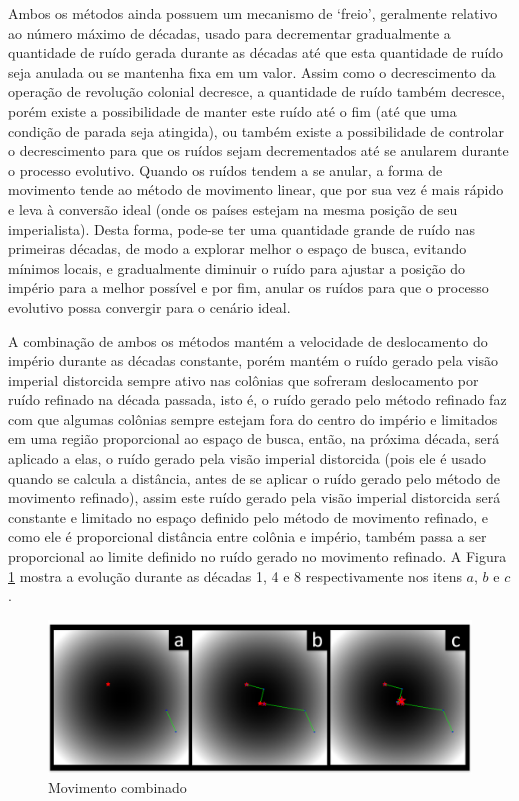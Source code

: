 Ambos os métodos ainda possuem um mecanismo de ‘freio’, geralmente relativo ao número máximo de décadas, usado para decrementar gradualmente a quantidade de ruído gerada durante as décadas até que esta quantidade de ruído seja anulada ou se mantenha fixa em um valor. Assim como o decrescimento da operação de revolução colonial decresce, a quantidade de ruído também decresce, porém existe a possibilidade de manter este ruído até o fim (até que uma condição de parada seja atingida), ou também existe a possibilidade de controlar o decrescimento para que os ruídos sejam decrementados até se anularem durante o processo evolutivo. Quando os ruídos tendem a se anular, a forma de movimento tende ao método de movimento linear, que por sua vez é mais rápido e leva à conversão ideal (onde os países estejam na mesma posição de seu imperialista). Desta forma, pode-se ter uma quantidade grande de ruído nas primeiras décadas, de modo a explorar melhor o espaço de busca, evitando mínimos locais, e gradualmente diminuir o ruído para ajustar a posição do império para a melhor possível e por fim, anular os ruídos para que o processo evolutivo possa convergir para o cenário ideal.

A combinação de ambos os métodos mantém a velocidade de deslocamento do império durante as décadas constante, porém mantém o ruído gerado pela visão imperial distorcida sempre ativo nas colônias que sofreram deslocamento por ruído refinado na década passada, isto é, o ruído gerado pelo método refinado faz com que algumas colônias sempre estejam fora do centro do império e limitados em uma região proporcional ao espaço de busca, então, na próxima década, será aplicado a elas, o ruído gerado pela visão imperial distorcida (pois ele é usado quando se calcula a distância, antes de se aplicar o ruído gerado pelo método de movimento refinado), assim este ruído gerado pela visão imperial distorcida será constante e limitado no espaço definido pelo método de movimento refinado, e como ele é proporcional distância entre colônia e império, também passa a ser proporcional ao limite definido no ruído gerado no movimento refinado. A Figura \ref{fig:MovimentoCombinado} mostra a evolução durante as décadas 1, 4 e 8 respectivamente nos itens \(a\), \(b\) e \(c\).

\begin{figure}[h]
	\centering
	\includegraphics[scale=0.6]{Figuras/MovimentoCombinado.png}
	\caption{Movimento combinado}	
    \label{fig:MovimentoCombinado}
\end{figure}

